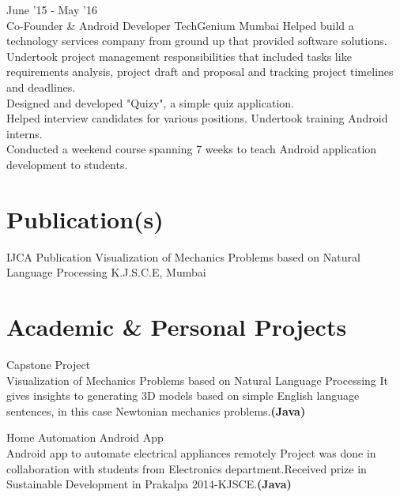 \documentclass[10pt, a4paper, sans]{moderncv}
\begin{document}
\cventry
{June '15 - May '16 \\ {\faAndroid} {\faBriefcase}}
{Co-Founder \& Android Developer}
{TechGenium}
{Mumbai}
{}
{
{\faCaretRight} Helped build a technology services company from ground up that provided software solutions. \\
{\faCaretRight} Undertook project management responsibilities that included tasks like requirements analysis, project draft and proposal and tracking project timelines and deadlines. \\
{\faCaretRight} Designed and developed "Quizy", a simple quiz application. \\
{\faCaretRight} Helped interview candidates for various positions. Undertook training Android interns. \\
{\faCaretRight} Conducted a weekend course spanning 7 weeks to teach Android application development to students. %
}

\section{Publication(s)}
\cventry
{IJCA Publication 
\href{http://www.ijcaonline.org/archives/volume116/number14/20408-2766}{\faFile}}
{Visualization of Mechanics Problems based on
Natural Language Processing}
{K.J.S.C.E, Mumbai}
{}
{}
{}

\section{Academic \& Personal Projects}
\cventry
{Capstone Project \\ {\faGithub}}
{Visualization of Mechanics Problems based on
Natural Language Processing}
{}
{}
{}
{It gives insights to generating 3D models based on simple English language sentences, in this case Newtonian mechanics problems.\bfseries{(Java)}}

\cventry
{Home Automation Android App \\ {\faAndroid}}
{Android app to automate electrical appliances remotely}
{}
{}
{}
{Project was done in collaboration with students from Electronics department.Received  prize in Sustainable Development in Prakalpa 2014-KJSCE.\bfseries{(Java)}}

\end{document}
